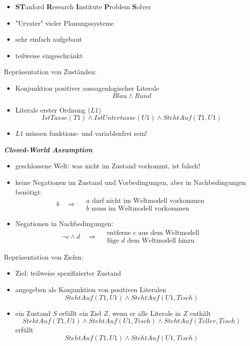 \begin{itemize}
\item \textbf{ST}anford \textbf{R}esearch \textbf{I}nstitute \textbf{P}roblem \textbf{S}olver
\item "{}Urvater"{} vieler Planungssysteme
\item sehr einfach aufgebaut
\item teilweise eingeschränkt
\end{itemize}
Repräsentation von Zuständen:
\begin{itemize}
\item Konjunktion positiver aussagenlogischer Literale $$Blau \wedge Rund$$
\item Literale erster Ordnung ($L1$) $$IstTasse(T1) \wedge IstUntertasse(U1) \wedge StehtAuf(T1,U1)$$
\item $L1$ müssen funktions- und variablenfrei sein!
\end{itemize}
\textbf{\textsl{Closed-World Assumption}}
\begin{itemize}
\item geschlossene Welt: was nicht im Zustand vorkommt, ist falsch!
\item keine Negationen im Zustand und Vorbedingungen, aber in Nachbedingungen benötigt:
$$b \quad \Rightarrow \quad \begin{array}{l} a \textrm{ darf nicht im Weltmodell vorkommen} \\ b \textrm{ muss im Weltmodell vorkommen} \end{array}$$
\item Negationen in Nachbedingungen:
$$\neg c \wedge d \quad \Rightarrow \quad \begin{array}{l} \textrm{entferne } c \textrm{ aus dem Weltmodell} \\ \textrm{füge } d \textrm{ dem Weltmodell hinzu} \end{array}$$
\end{itemize}
Repräsentation von Zielen:
\begin{itemize}
\item Ziel: teilweise spezifizierter Zustand
\item angegeben als Konjunktion von positiven Literalen
$$StehtAuf(T1,U1) \wedge StehtAuf(U1,Tisch)$$
\item ein Zustand $S$ erfüllt ein Ziel $Z$, wenn er alle Literale in $Z$ enthält
$$StehtAuf(T1,U1) \wedge StehtAuf(U1,Tisch) \wedge StehtAuf(Teller,Tisch)$$
erfüllt $$StehtAuf(T1,U1) \wedge StehtAuf(U1,Tisch)$$
\end{itemize}
